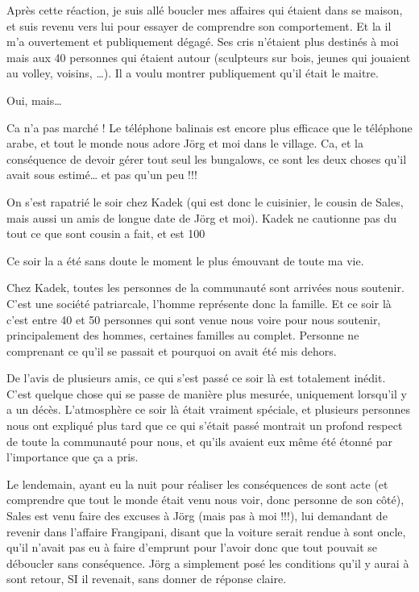 \begin{multicols}{2}
Après cette réaction, je suis allé boucler mes affaires qui étaient dans se maison, et suis revenu vers lui pour essayer de comprendre son comportement. Et la il m’a ouvertement et publiquement dégagé. Ses cris n’étaient plus destinés à moi mais aux 40 personnes qui étaient autour (sculpteurs sur bois, jeunes qui jouaient au volley, voisins, …). Il a voulu montrer publiquement qu’il était le maitre.

Oui, mais…

Ca n’a pas marché ! Le téléphone balinais est encore plus efficace que le téléphone arabe, et tout le monde nous adore Jörg et moi dans le village. Ca, et la conséquence de devoir gérer tout seul les bungalows, ce sont les deux choses qu’il avait sous estimé… et pas qu’un peu !!!

On s’est rapatrié le soir chez Kadek (qui est donc le cuisinier, le cousin de Sales, mais aussi un amis de longue date de Jörg et moi). Kadek ne cautionne pas du tout ce que sont cousin a fait, et est 100%

Ce soir la a été sans doute le moment le plus émouvant de toute ma vie.

Chez Kadek, toutes les personnes de la communauté sont arrivées nous soutenir. C’est une société patriarcale, l’homme représente donc la famille. Et ce soir là c’est entre 40 et 50 personnes qui sont venue nous voire pour nous soutenir, principalement des hommes, certaines familles au complet. Personne ne comprenant ce qu’il se passait et pourquoi on avait été mis dehors.

De l’avis de plusieurs amis, ce qui s’est passé ce soir là est totalement inédit. C’est quelque chose qui se passe de manière plus mesurée, uniquement lorsqu’il y a un décès. L’atmosphère ce soir là était vraiment spéciale, et plusieurs personnes nous ont expliqué plus tard que ce qui s’était passé montrait un profond respect de toute la communauté pour nous, et qu’ils avaient eux même été étonné par l’importance que ça a pris.

Le lendemain, ayant eu la nuit pour réaliser les conséquences de sont acte (et comprendre que tout le monde était venu nous voir, donc personne de son côté), Sales est venu faire des excuses à Jörg (mais pas à moi !!!), lui demandant de revenir dans l’affaire Frangipani, disant que la voiture serait rendue à sont oncle, qu’il n’avait pas eu à faire d’emprunt pour l’avoir donc que tout pouvait se déboucler sans conséquence. Jörg a simplement posé les conditions qu’il y aurai à sont retour, SI il revenait, sans donner de réponse claire.


\end{multicols}
